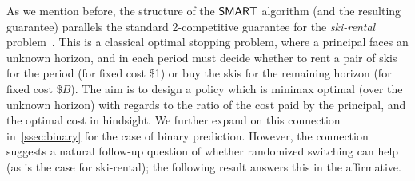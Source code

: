 As we mention before, the structure of the $\mathsf{SMART}$ algorithm (and the resulting guarantee) parallels the standard 2-competitive guarantee for the \emph{ski-rental} problem~\citep{karlin1994competitive}. 
This is a classical optimal stopping problem, where a principal faces an unknown horizon, and in each period must decide whether to rent a pair of skis for the period (for fixed cost \$1) or buy the skis for the remaining horizon (for fixed cost \$$B$). The aim is to design a policy which is minimax optimal (over the unknown horizon) with regards to the ratio of the cost paid by the principal, and the optimal cost in hindsight. 
We further expand on this connection in~\cref{ssec:binary} for the case of binary prediction. However, the connection suggests a natural follow-up question of whether randomized switching can help (as is the case for ski-rental); the following result answers this in the affirmative.


